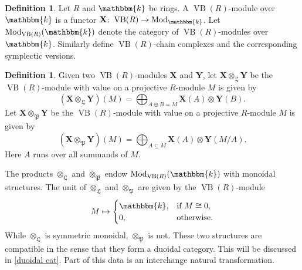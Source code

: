 \documentclass[11pt,letterpaper]{amsart}
\newcommand{\bk}{\mathbbm{k}}
\DeclareMathOperator{\Mod}{Mod}
\DeclareMathOperator{\VB}{VB}
\newcommand{\gX}{\mathbf{X}}
\newcommand{\gY}{\mathbf{Y}}
\newcommand{\PP}{\mathfrak{P}}
\newcommand{\LL}{\mathfrak{L}}
\numberwithin{theoremcounter}{section}
\theoremstyle{definition}
\newtheorem{definition}[Defauto]{Definition}
\theoremstyle{remark}
\begin{document}
\begin{definition}
    Let $R$ and $\bk$ be rings. A $\VB(R)$-module over $\bk$ is a functor $\gX\colon \VB(R) \to \Mod_\bk$. Let $\Mod_{\VB(R)}(\bk)$ denote the category of $\VB(R)$-modules over $\bk$.  
    Similarly define  $\VB(R)$-chain complexes and the corresponding symplectic versions. 
\end{definition}


\begin{definition} Given two $\VB(R)$-modules $\gX$ and $\gY$, let $\gX \otimes_\LL \gY$ be the $\VB(R)$-module with value on a projective $R$-module $M$ is given by $$(\gX \otimes_\LL \gY)(M) =\bigoplus_{A \oplus B=M} \gX(A) \otimes \gY(B).$$ 
Let  $\gX \otimes_\PP \gY$ be the $\VB(R)$-module with value on a projective $R$-module $M$ is given by $$(\gX \otimes_\PP \gY)(M) =\bigoplus_{A \subseteq M} \gX(A) \otimes \gY(M/A).$$ Here $A$ runs over all summands of $M$. 
\end{definition}



The products $\otimes_\LL$ and $\otimes_\PP$ endow $\Mod_{\VB(R)}(\bk)$ with monoidal structures. The unit of $\otimes_\LL$ and $\otimes_\PP$ are given by the $\VB(R)$-module $$M \mapsto \begin{cases}
\bk, & \text{if } M\cong 0,\\
0, & \text{otherwise.}
\end{cases} $$ While $\otimes_\LL$ is symmetric monoidal, $\otimes_\PP$ is not. These two structures are compatible in the sense that they form a duoidal category. This will be discussed in \autoref{duoidal cat}. Part of this data is an interchange natural transformation.
\end{document}
